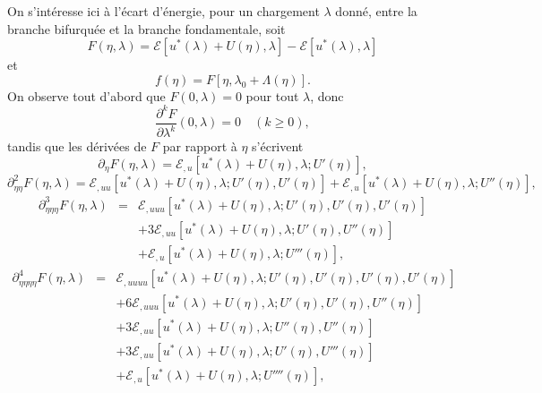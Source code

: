 \documentclass[12pt, final]{amsart}
\begin{document}
On s'intéresse ici {\`a} l'écart d'énergie, pour un chargement
$\lambda$ donné, entre la branche bifurquée et la branche
fondamentale, soit
\begin{equation}
  F (\eta, \lambda) =\mathcal{E} [u^{\ast} (\lambda) + U (\eta), \lambda]
  -\mathcal{E} [u^{\ast} (\lambda), \lambda]
\end{equation}
et
\begin{equation}
  f (\eta) = F [\eta, \lambda_0 + \Lambda (\eta)] .
\end{equation}
On observe tout d'abord que $F (0, \lambda) = 0$ pour tout $\lambda$, donc
\begin{equation}
  \frac{\partial^k F}{\partial \lambda^k} (0, \lambda) = 0 \quad (k \geq 0),
\end{equation}
tandis que les dérivées de $F$ par rapport {\`a} $\eta$ s'écrivent
\begin{equation}
  \partial_{\eta} F (\eta, \lambda) =\mathcal{E}_{, u} [u^{\ast} (\lambda) + U
  (\eta), \lambda ; U' (\eta)],
\end{equation}
\begin{equation}
  \partial_{\eta  \eta}^2 F (\eta, \lambda) =\mathcal{E}_{, u
  u} [u^{\ast} (\lambda) + U (\eta), \lambda ; U' (\eta), U' (\eta)]
  +\mathcal{E}_{, u} [u^{\ast} (\lambda) + U (\eta), \lambda ; U'' (\eta)],
\end{equation}
\begin{eqnarray}
  \partial_{\eta  \eta  \eta}^3 F (\eta, \lambda) & = &
  \mathcal{E}_{, u  u  u} [u^{\ast} (\lambda) + U (\eta),
  \lambda ; U' (\eta), U' (\eta), U' (\eta)] \nonumber\\
  &  &  + 3\mathcal{E}_{, u  u} [u^{\ast} (\lambda) + U
  (\eta), \lambda ; U' (\eta), U'' (\eta)] \nonumber\\
  &  &  +\mathcal{E}_{, u} [u^{\ast} (\lambda) + U (\eta), \lambda ;
  U''' (\eta)],
\end{eqnarray}
\begin{eqnarray}
  \partial_{\eta  \eta  \eta  \eta}^4 F (\eta,
  \lambda) & = & \mathcal{E}_{, u  u  u  u} [u^{\ast}
  (\lambda) + U (\eta), \lambda ; U' (\eta), U' (\eta), U' (\eta), U' (\eta)]
  \nonumber\\
  &  &  + 6\mathcal{E}_{, u  u  u} [u^{\ast}
  (\lambda) + U (\eta), \lambda ; U' (\eta), U' (\eta), U'' (\eta)]
  \nonumber\\
  &  &  + 3\mathcal{E}_{, u  u} [u^{\ast} (\lambda) + U
  (\eta), \lambda ; U'' (\eta), U'' (\eta)] \nonumber\\
  &  &  + 3\mathcal{E}_{, u  u} [u^{\ast} (\lambda) + U
  (\eta), \lambda ; U' (\eta), U''' (\eta)] \nonumber\\
  &  &  +\mathcal{E}_{, u} [u^{\ast} (\lambda) + U (\eta), \lambda ;
  U'''' (\eta)],
\end{eqnarray}
\end{document}
